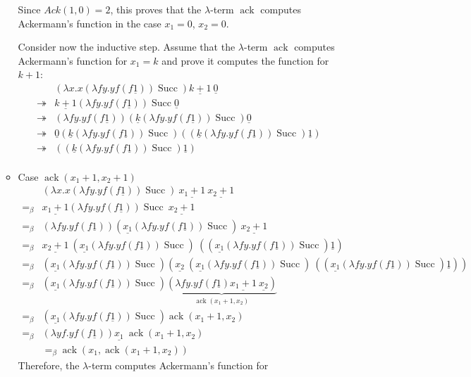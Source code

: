 \documentclass[10pt,\jkfside,a4paper]{article}
\begin{document}
\begin{enumerate}[label=\arabic*.]
\begin{itemize}
Since $Ack(1, 0) = 2$, this proves that the $\lambda$-term $\mathop{ack}$
computes Ackermann's function in the case $x_1 = 0$, $x_2=0$.

Consider now the inductive step. Assume that the $\lambda$-term
$\mathop{ack}$ computes Ackermann's function for $x_1 = k$ and prove it
computes the function for $k + 1$:
\begin{align*}
& (\lambda x. x(\lambda f y. y f(f \underline{1}))
\mathop{Succ})\underline{k+1}\ \underline{0} \\
\twoheadrightarrow &
\underline{k+1}(\lambda f y. y f(f \underline{1}))
\mathop{Succ}\underline{0} \\
\twoheadrightarrow &
(\lambda f y. y f(f \underline{1}))(\underline{k}(\lambda f y. y f(f \underline{1}))
\mathop{Succ})\underline{0} \\
\twoheadrightarrow &
\underline{0} (\underline{k}(\lambda f y. y f(f \underline{1}))
\mathop{Succ})((\underline{k}(\lambda f y. y f(f \underline{1}))
\mathop{Succ}) \underline{1}) \\
\twoheadrightarrow &
((\underline{k}(\lambda f y. y f(f \underline{1}))
\mathop{Succ}) \underline{1}) \\
\end{align*}

\item Case $\mathop{ack}(x_1 + 1, x_2 + 1)$
\begin{align*}
&(\lambda x. x(\lambda f y. y f(f \underline{1}))\mathop{Succ})\
\underline{x_1 + 1}\ \underline{x_2 + 1} \\
=_{\beta}& \underline{x_1 + 1}(\lambda f y. y f(f \underline{1}))
\mathop{Succ}\ \underline{x_2 + 1} \\
=_{\beta}& (\lambda f y. y f(f \underline{1}))
(\underline{x_1}(\lambda f y. y f(f \underline{1}))
\mathop{Succ})\ \underline{x_2 + 1} \\
=_{\beta}&
\underline{x_2 + 1}\ (\underline{x_1}(\lambda f y. y f(f \underline{1}))
\mathop{Succ})\ ((\underline{x_1}(\lambda f y. y f(f \underline{1}))
\mathop{Succ}) \underline{1}) \\
=_{\beta}&
(\underline{x_1}(\lambda f y. y f(f \underline{1}))
\mathop{Succ})
(\underline{x_2}\ (\underline{x_1}(\lambda f y. y f(f
\underline{1}))
\mathop{Succ})\ ((\underline{x_1}(\lambda f y. y f(f \underline{1}))
\mathop{Succ}) \underline{1})) \\
=_{\beta}&
(\underline{x_1}(\lambda f y. y f(f \underline{1}))
\mathop{Succ})
\underbrace{(\lambda fy. y f(f\underline{1})\underline{x_1 + 1}\
\underline{x_2})}_{\mathop{ack}(x_1 + 1, x_2)} \\
=_{\beta}&
(\underline{x_1}(\lambda f y. y f(f \underline{1}))
\mathop{Succ})
\mathop{ack}(x_1 + 1, x_2) \\
=_{\beta}&
(\lambda yf. yf(f\underline{1}))\underline{x_1}
\ \mathop{ack}(x_1 + 1, x_2) \\
&=_{\beta} \mathop{ack}(x_1, \mathop{ack}(x_1 + 1, x_2))
\end{align*}
Therefore, the $\lambda$-term computes Ackermann's function for


\end{itemize}
\end{enumerate}
\end{document}
